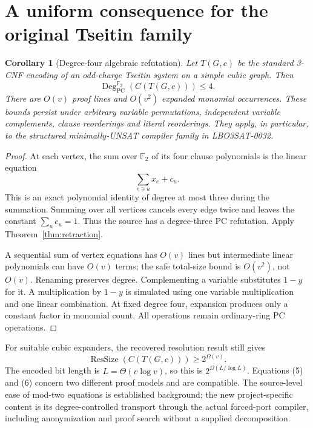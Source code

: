 \documentclass[11pt]{article}
\newtheorem{corollary}[theorem]{Corollary}
\newcommand{\PC}{\operatorname{PC}}
\newcommand{\F}{\mathbb F}
\newcommand{\degpc}{\operatorname{Deg}_{\PC}}
\newcommand{\Res}{\operatorname{ResSize}}
\begin{document}
\section{A uniform consequence for the original Tseitin family}
\begin{corollary}[Degree-four algebraic refutation]\label{cor:tseitin}
Let $T(G,c)$ be the standard 3-CNF encoding of an odd-charge Tseitin system on a simple cubic graph. Then
\[
 \degpc^{\F_2}(C(T(G,c)))\le4.
\tag{5}
\]
There are $O(v)$ proof lines and $O(v^2)$ expanded monomial occurrences. These bounds persist under arbitrary variable permutations, independent variable complements, clause reorderings and literal reorderings. They apply, in particular, to the structured minimally-UNSAT compiler family in LBO3SAT-0032.
\end{corollary}
\begin{proof}
At each vertex, the sum over $\F_2$ of its four clause polynomials is the linear equation
\[
 \sum_{e\ni u}x_e+c_u.
\]
This is an exact polynomial identity of degree at most three during the summation. Summing over all vertices cancels every edge twice and leaves the constant $\sum_u c_u=1$. Thus the source has a degree-three PC refutation. Apply Theorem~\ref{thm:retraction}.

A sequential sum of vertex equations has $O(v)$ lines but intermediate linear polynomials can have $O(v)$ terms; the safe total-size bound is $O(v^2)$, not $O(v)$. Renaming preserves degree. Complementing a variable substitutes $1-y$ for it. A multiplication by $1-y$ is simulated using one variable multiplication and one linear combination. At fixed degree four, expansion produces only a constant factor in monomial count. All operations remain ordinary-ring PC operations.
\end{proof}

For suitable cubic expanders, the recovered resolution result still gives
\[
 \Res(C(T(G,c)))\ge2^{\Omega(v)}.
\tag{6}
\]
The encoded bit length is $L=\Theta(v\log v)$, so this is $2^{\Omega(L/\log L)}$. Equations (5) and (6) concern two different proof models and are compatible. The source-level ease of mod-two equations is established background; the new project-specific content is its degree-controlled transport through the actual forced-port compiler, including anonymization and proof search without a supplied decomposition.
\end{document}
